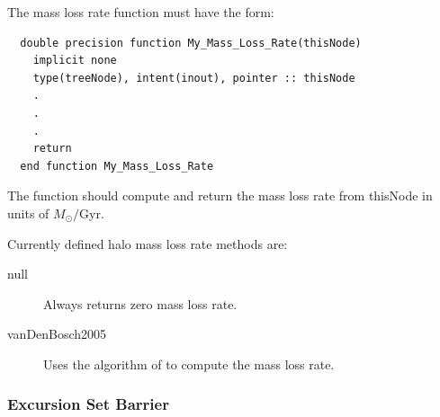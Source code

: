 The mass loss rate function must have the form:
\begin{verbatim}
  double precision function My_Mass_Loss_Rate(thisNode)
    implicit none
    type(treeNode), intent(inout), pointer :: thisNode
    .
    .
    .
    return
  end function My_Mass_Loss_Rate
\end{verbatim}
The function should compute and return the mass loss rate from {\normalfont \ttfamily thisNode} in units of $M_\odot/$Gyr.

Currently defined halo mass loss rate methods are:
\begin{description}
 \item [{\normalfont \ttfamily null}] Always returns zero mass loss rate.
 \item [{\normalfont \ttfamily vanDenBosch2005}] Uses the algorithm of \cite{van_den_bosch_mass_2005} to compute the mass loss rate.
\end{description}

\subsubsection{Excursion Set Barrier}\label{sec:excursionSetBarrierMethod}

